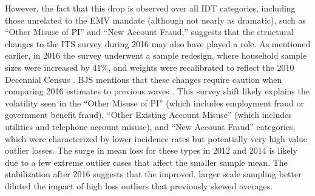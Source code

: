 However, the fact that this drop is observed over all IDT categories, including those unrelated to the EMV mandate (although not nearly as dramatic), such as ``Other Misuse of PI'' and ``New Account Fraud,'' suggests that the structural changes to the ITS survey during 2016 may also have played a role. As mentioned earlier, in 2016 the survey underwent a sample redesign, where household sample sizes were increased by 41\%, and weights were recalibrated to reflect the 2010 Decennial Census \cite{Harrell2019Victims}. BJS mentions that these changes require caution when comparing 2016 estimates to previous waves \cite{Harrell2019Victims}. This survey shift likely explains the volatility seen in the ``Other Misuse of PI'' (which includes employment fraud or government benefit fraud), ``Other Existing Account Misuse'' (which includes utilities and telephone account misuse), and ``New Account Fraud'' categories, which were characterized by lower incidence rates but potentially very high value outlier losses. The surge in mean loss for these types in 2012 and 2014 is likely due to a few extreme outlier cases that affect the smaller sample mean. The stabilization after 2016 suggests that the improved, larger scale sampling better diluted the impact of high loss outliers that previously skewed averages.
